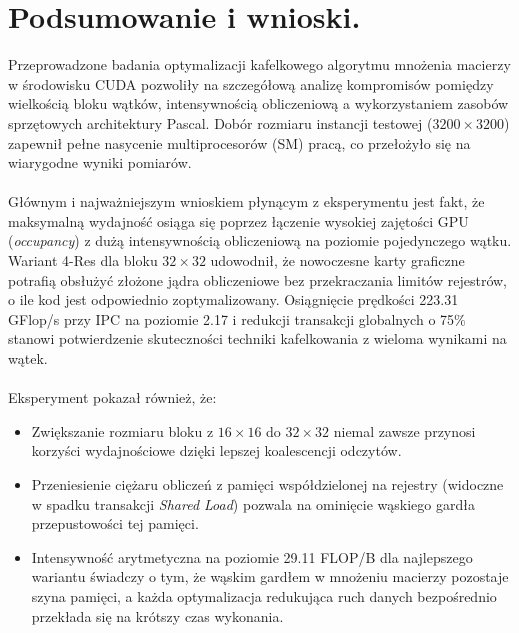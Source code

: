 \documentclass[10pt]{article}
\begin{document}
\section{Podsumowanie i wnioski.}

Przeprowadzone badania optymalizacji kafelkowego algorytmu mnożenia 
macierzy w środowisku CUDA pozwoliły na szczegółową analizę kompromisów 
pomiędzy wielkością bloku wątków, intensywnością obliczeniową 
a wykorzystaniem zasobów sprzętowych architektury Pascal. Dobór rozmiaru instancji 
testowej ($3200\times3200$) zapewnił pełne nasycenie multiprocesorów (SM) pracą, 
co przełożyło się na wiarygodne wyniki pomiarów.
\\ \\
Głównym i najważniejszym wnioskiem płynącym z eksperymentu jest fakt, że 
maksymalną wydajność osiąga się poprzez łączenie wysokiej zajętości GPU 
(\textit{occupancy}) z dużą intensywnością obliczeniową na poziomie pojedynczego wątku. 
Wariant 4-Res dla bloku $32 \times 32$ udowodnił, że nowoczesne karty graficzne 
potrafią obsłużyć złożone jądra obliczeniowe bez przekraczania limitów rejestrów, 
o ile kod jest odpowiednio zoptymalizowany. Osiągnięcie prędkości 223.31 GFlop/s 
przy IPC na poziomie 2.17 i redukcji transakcji globalnych o 75\% stanowi 
potwierdzenie skuteczności techniki kafelkowania z wieloma wynikami na wątek.
\\ \\
Eksperyment pokazał również, że:
\begin{itemize}
 \item Zwiększanie rozmiaru bloku z $16 \times 16$ do $32 \times 32$ niemal 
 zawsze przynosi korzyści wydajnościowe dzięki lepszej koalescencji odczytów.
 \item Przeniesienie ciężaru obliczeń z pamięci współdzielonej na rejestry 
 (widoczne w spadku transakcji \textit{Shared Load}) pozwala na ominięcie 
 wąskiego gardła przepustowości tej pamięci.
 \item Intensywność arytmetyczna na poziomie 29.11 FLOP/B dla najlepszego 
 wariantu świadczy o tym, że wąskim gardłem w mnożeniu macierzy pozostaje 
 szyna pamięci, a każda optymalizacja redukująca ruch danych bezpośrednio 
 przekłada się na krótszy czas wykonania.
\end{itemize}
\end{document}
